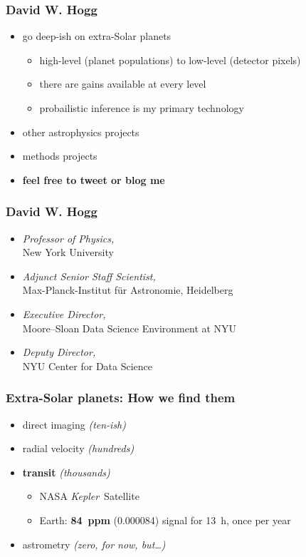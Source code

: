 \documentclass[aspectratio=169]{beamer}
\renewcommand{\emph}[1]{\textbf{#1}}
\newcommand{\project}[1]{\textsl{#1}}
\newcommand{\Kepler}{\project{Kepler}}
\begin{document}
\begin{frame}
  \frametitle{David W. Hogg}
  \begin{itemize}
  \item go deep-ish on extra-Solar planets
    \begin{itemize}
    \item high-level (planet populations) to low-level (detector pixels)
    \item there are gains available at every level
    \item probailistic inference is my primary technology
    \end{itemize}
  \item other astrophysics projects
  \item methods projects
  \item \emph{feel free to tweet or blog me}
  \end{itemize}
\end{frame}

\begin{frame}
  \frametitle{David W. Hogg}
  \begin{itemize}
  \item \textsl{Professor of Physics,}\\ New York University
  \item \textsl{Adjunct Senior Staff Scientist,}\\ Max-Planck-Institut f\"ur Astronomie, Heidelberg
  \item \textsl{Executive Director,}\\ Moore--Sloan Data Science Environment at NYU
  \item \textsl{Deputy Director,}\\ NYU Center for Data Science
  \end{itemize}
\end{frame}

\begin{frame}
  \frametitle{Extra-Solar planets: How we find them}
  \begin{itemize}
  \item direct imaging \textit{(ten-ish)}
  \item radial velocity \textit{(hundreds)}
  \item \emph{transit} \textit{(thousands)}
    \begin{itemize}
    \item NASA \Kepler\ Satellite
    \item Earth: \emph{84~ppm} (0.000084) signal for 13~h, once per year
    \end{itemize}
  \item astrometry \textit{(zero, for now, but\ldots)}
  \end{itemize}
\end{frame}
\end{document}
